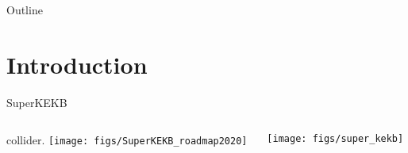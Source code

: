 \begin{frame}{Outline}
 \tableofcontents
\end{frame}
\section{Introduction}
\begin{frame}{SuperKEKB}
\begin{columns}
\begin{column}{0.48\linewidth} 
\bi \small
\item{\epem collider.}
\ei
\vspace{0.1cm}
\texttt{[image: figs/SuperKEKB\_roadmap2020]}
\end{column}
\begin{column}{0.52\linewidth}
\texttt{[image: figs/super\_kekb]} 
\end{column}
\end{columns}
\end{frame}
